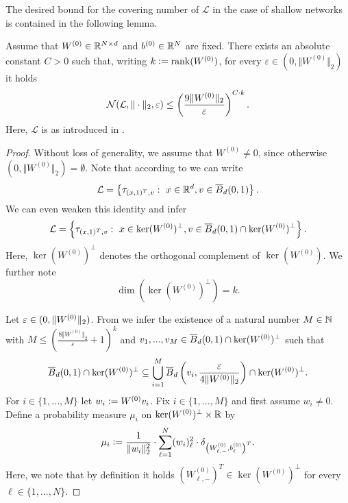 The desired bound for the covering number of $\mathcal{L}$ in the case of shallow networks is contained in the following lemma. 
\begin{lemma} \label{lem:cov_num_bound}
Assume that $W^{(0)} \in \mathbb{R}^{N \times d}$ and $b^{(0)} \in \mathbb{R}^N$ are fixed. There exists an absolute constant $C>0$ such that, writing $k \mathrel{\mathop:}= \operatorname{rank}(W^{(0)})$, for every $\varepsilon \in (0, \Vert W^{(0)} \Vert_2)$ it holds
\begin{equation*}
\mathcal{N}(\mathcal{L}, \Vert \cdot \Vert_2, \varepsilon) \leq \left(\frac{9 \Vert W^{(0)} \Vert_2}{\varepsilon}\right)^{C\cdot k}.
\end{equation*}
Here, $\mathcal{L}$ is as introduced in .
\end{lemma}
\begin{proof}
Without loss of generality, we assume that $W^{(0)} \neq 0$, since otherwise $(0, \Vert W^{(0)} \Vert_2) = \emptyset$. Note that according to  we can write
\begin{equation*}
\mathcal{L} = \left\{\tau_{(x,1)^T, v}: \ x \in \mathbb{R}^d, v \in \overline{B}_d(0,1) \right\}.
\end{equation*}
We can even weaken this identity and infer
\begin{equation*}
\mathcal{L} = \left\{\tau_{(x,1)^T, v}: \ x \in \ker(W^{(0)})^{\perp}, v \in \overline{B}_d(0,1) \cap \ker(W^{(0)})^{\perp} \right\}.
\end{equation*}
Here, $\ker(W^{(0)})^{\perp}$ denotes the orthogonal complement of $\ker(W^{(0)})$. We further note 
\begin{equation*}
\dim(\ker(W^{(0)})^\perp) = k.
\end{equation*}

Let $\varepsilon \in (0, \Vert W^{(0)} \Vert_2)$. From  we infer the existence of a natural number $M \in \mathbb{N}$ with $M \leq \left( \frac{8 \Vert W^{(0)} \Vert_2}{\varepsilon} + 1\right)^k$ and $v_1, ..., v_M \in \overline{B}_d(0,1) \cap \ker(W^{(0)})^\perp$ such that
\begin{equation*}
\overline{B}_d(0,1) \cap \ker(W^{(0)})^\perp \subseteq \bigcup_{i=1}^M \overline{B}_d\left(v_i,\frac{\varepsilon}{ 4 \Vert W^{(0)} \Vert_2}\right) \cap \ker(W^{(0)})^\perp.
\end{equation*}
For $i \in \{1,...,M\}$ let $w_i \mathrel{\mathop:}= W^{(0)}v_i$. Fix $i \in \{1,...,M\}$ and first assume $w_i \neq 0$. Define a probability measure $\mu_i$ on $\ker(W^{(0)})^{\perp} \times \mathbb{R}$ by
\begin{equation*}
\mu_i \mathrel{\mathop:}= \frac{1}{\Vert w_i \Vert_2^2} \cdot \sum_{\ell = 1}^N (w_i)_\ell^2 \cdot \delta_{\left(W^{(0)}_{\ell,-}, b^{(0)}_\ell\right)^T}.
\end{equation*}
Here, we note that by definition it holds $\left(W^{(0)}_{\ell,-}\right)^T \in \ker(W^{(0)})^\perp$ for every $\ell \in \{1,...,N\}$.


\end{proof}
